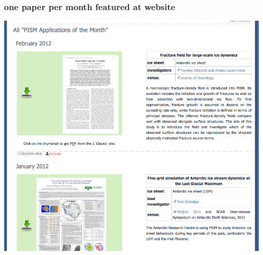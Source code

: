 \documentclass[hide notes,intlimits]{beamer}
\begin{document}
\begin{frame}
  \frametitle{one paper per month featured at website}
  \begin{center}
    \includegraphics[height=0.75\textheight]{application-of-the-month.png}
  \end{center}
\end{frame}
\end{document}
